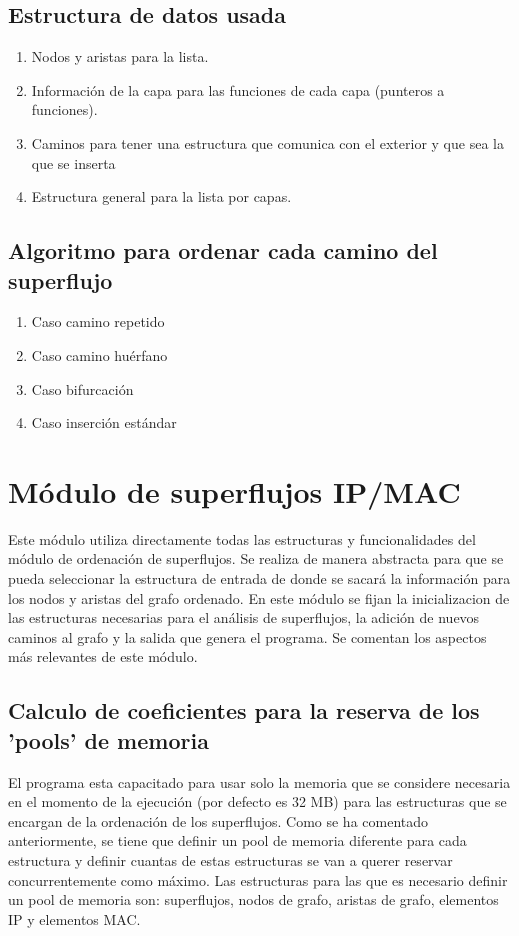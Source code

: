 \documentclass[twoside, 12pt]{epstfg}
\begin{document}

\subsection{Estructura de datos usada}
\begin{enumerate}[itemsep=0pt, topsep = 0pt]
\item Nodos y aristas para la lista. 
\item Información de la capa para las funciones de cada capa (punteros a funciones).
\item Caminos para tener una estructura que comunica con el exterior y que sea la que se inserta
\item Estructura general para la lista por capas.
\end{enumerate}

\subsection{Algoritmo para ordenar cada camino del superflujo}
\begin{enumerate}[itemsep=0pt, topsep = 0pt]
\item Caso camino repetido
\item Caso camino huérfano
\item Caso bifurcación
\item Caso inserción estándar
\end{enumerate}



\section{Módulo de superflujos IP/MAC}
Este módulo utiliza directamente todas las estructuras y funcionalidades del módulo de ordenación de superflujos. Se realiza de manera abstracta para que se pueda seleccionar la estructura de entrada de donde se sacará la información para los nodos y aristas del grafo ordenado. En este módulo se fijan la inicializacion de las estructuras necesarias para el análisis de superflujos, la adición de nuevos caminos al grafo y la salida que genera el programa. Se comentan los aspectos más relevantes de este módulo.

\subsection{Calculo de coeficientes para la reserva de los 'pools' de memoria}
El programa esta capacitado para usar solo la memoria que se considere necesaria en el momento de la ejecución (por defecto es 32 MB) para las estructuras que se encargan de la ordenación de los superflujos. Como se ha comentado anteriormente, se tiene que definir un pool de memoria diferente para cada estructura y definir cuantas de estas estructuras se van a querer reservar concurrentemente como máximo. Las estructuras para las que es necesario definir un pool de memoria son: superflujos, nodos de grafo, aristas de grafo, elementos IP y elementos MAC. 
\end{document}
